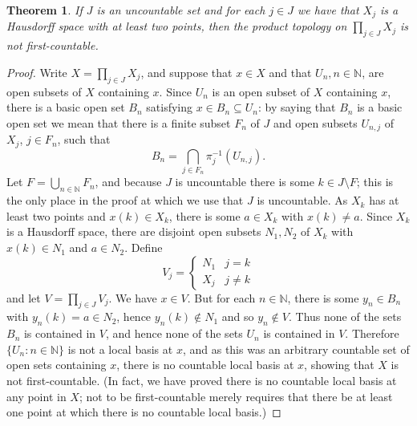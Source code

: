 \documentclass{article}
\newtheorem{theorem}{Theorem}
\theoremstyle{definition}
\begin{document}
\begin{theorem}
If $J$ is an uncountable set and for each $j \in J$ we have that $X_j$ is  a Hausdorff space with at least two points, then the product topology on $\prod_{j \in J} X_j$
is not first-countable.
\end{theorem}
\begin{proof}
Write $X=\prod_{j \in J} X_j$,
and suppose that $x \in X$ and   that $U_n, n\in \mathbb{N}$,
are open subsets of $X$ containing $x$. 
Since $U_n$ is an open subset of $X$ containing $x$, there is a basic open set $B_n$ satisfying $x \in B_n \subseteq U_n$:
by saying that $B_n$ is a basic open set we mean that
  there is a finite subset $F_n$ of $J$ and open subsets $U_{n,j}$ of $X_j$, $j \in F_n$, such that
\[
B_n = \bigcap_{j \in F_n} \pi_j^{-1} (U_{n,j}).
\]
Let $F=\bigcup_{n \in \mathbb{N}} F_n$, and because $J$ is uncountable there is some $k \in 
J \setminus F$; this is the only place in the proof at which we use that $J$ is uncountable. As $X_k$ has at least two points and $x(k) \in X_k$, there is some $a \in X_k$ with $x(k) \neq a$.
Since $X_k$ is a Hausdorff space, there are disjoint open subsets $N_1, N_2$ of $X_k$ with $x(k) \in N_1$ and $a \in N_2$.
Define
\[
V_j = \begin{cases}
N_1&j = k\\
X_j&j \neq k
\end{cases}
\]
and let $V=\prod_{j \in J} V_j$. We have $x \in V$. But for each $n \in \mathbb{N}$, there is some $y_n \in B_n$ with
$y_n(k)=a \in N_2$, hence $y_n(k) \not \in N_1$ and so $y_n \not \in V$. Thus none of the  sets $B_n$
is contained in $V$, and hence none of the sets
$U_n$ is contained in $V$. Therefore $\{U_n: n \in \mathbb{N}\}$  is not a local basis at $x$,
and as this was an arbitrary countable set of open sets containing $x$, there is no  countable local
basis at $x$, showing that  $X$ is not first-countable. (In fact, we have proved there is no countable local basis at any point in $X$; not
to be first-countable merely requires that there be at least one point at which there is no countable local basis.)
\end{proof}
\end{document}
